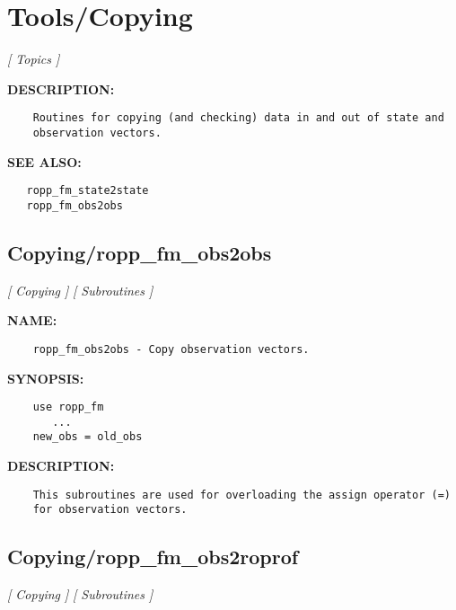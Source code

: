 \section{Tools/Copying}
\textsl{[ Topics ]}

\label{ch:robo87}
\label{ch:Tools_Copying}
\textbf{DESCRIPTION:}\hspace{0.08in}\begin{Verbatim}
    Routines for copying (and checking) data in and out of state and
    observation vectors.
\end{Verbatim}
\textbf{SEE ALSO:}\hspace{0.08in}\begin{Verbatim}
   ropp_fm_state2state
   ropp_fm_obs2obs
\end{Verbatim}
\subsection{Copying/ropp\_fm\_obs2obs}
\textsl{[ Copying ]}
\textsl{[ Subroutines ]}

\label{ch:robo27}
\label{ch:Copying_ropp_fm_obs2obs}
\textbf{NAME:}\hspace{0.08in}\begin{Verbatim}
    ropp_fm_obs2obs - Copy observation vectors.
\end{Verbatim}
\textbf{SYNOPSIS:}\hspace{0.08in}\begin{Verbatim}
    use ropp_fm
       ...
    new_obs = old_obs
\end{Verbatim}
\textbf{DESCRIPTION:}\hspace{0.08in}\begin{Verbatim}
    This subroutines are used for overloading the assign operator (=)
    for observation vectors.
\end{Verbatim}
\subsection{Copying/ropp\_fm\_obs2roprof}
\textsl{[ Copying ]}
\textsl{[ Subroutines ]}

